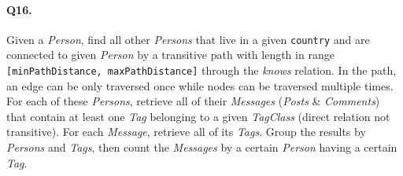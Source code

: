 \paragraph{Q16.}
Given a \emph{Person}, find all other \emph{Persons} that live in a
given \texttt{country} and are connected to given \emph{Person} by a
transitive path with length in range
\texttt{{[}minPathDistance,\ maxPathDistance{]}} through the
\emph{knows} relation.
In the path, an edge can be only traversed once while nodes can be
traversed multiple times.
For each of these \emph{Persons}, retrieve all of their \emph{Messages}
(\emph{Posts} \& \emph{Comments}) that contain at least one \emph{Tag}
belonging to a given \emph{TagClass} (direct relation not transitive).
For each \emph{Message}, retrieve all of its \emph{Tags}.
Group the results by \emph{Persons} and \emph{Tags}, then count the
\emph{Messages} by a certain \emph{Person} having a certain \emph{Tag}.
